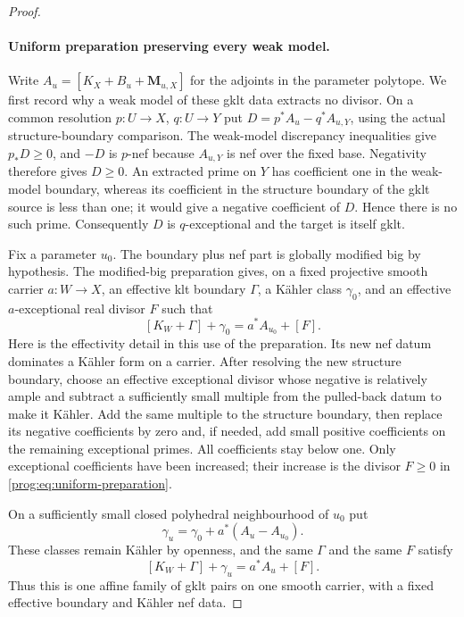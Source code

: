 \begin{proof}
\paragraph{Uniform preparation preserving every weak model.}
\label{prog:uniform-preparation}
Write $A_u=[K_X+B_u+\mathbf M_{u,X}]$ for the adjoints in the
parameter polytope. We first record why a weak model of these gklt data
extracts no divisor. On a common resolution $p:U\to X$, $q:U\to Y$
put $D=p^*A_u-q^*A_{u,Y}$, using the actual structure-boundary
comparison. The weak-model discrepancy inequalities give $p_*D\geq0$,
and $-D$ is $p$-nef because $A_{u,Y}$ is nef over the fixed base.
Negativity therefore gives $D\geq0$. An extracted prime on $Y$ has
coefficient one in the weak-model boundary, whereas its coefficient in
the structure boundary of the gklt source is less than one; it would
give a negative coefficient of $D$. Hence there is no such prime.
Consequently $D$ is $q$-exceptional and the target is itself gklt.

Fix a parameter $u_0$. The boundary plus nef part is globally
modified big by hypothesis. The modified-big preparation
\cite[Lemma~2.23]{HX} gives, on a fixed projective smooth carrier
$a:W\to X$, an effective klt boundary $\Gamma$, a K\"ahler class
$\gamma_0$, and an effective $a$-exceptional real divisor $F$ such that
\begin{equation}\label{prog:eq:uniform-preparation}
             [K_W+\Gamma]+\gamma_0=a^*A_{u_0}+[F].
\end{equation}
Here is the effectivity detail in this use of the preparation. Its new
nef datum dominates a K\"ahler form on a carrier. After resolving the
new structure boundary, choose an effective exceptional divisor whose
negative is relatively ample and subtract a sufficiently small multiple
from the pulled-back datum to make it K\"ahler. Add the same multiple
to the structure boundary,
then replace its negative coefficients by zero and, if needed, add
small positive coefficients on the remaining exceptional primes.
All coefficients stay below one. Only exceptional coefficients have
been increased; their increase is the divisor $F\geq0$ in
\eqref{prog:eq:uniform-preparation}.

On a sufficiently small closed polyhedral neighbourhood of $u_0$ put
\[
                \gamma_u=\gamma_0+a^*(A_u-A_{u_0}).
\]
These classes remain K\"ahler by openness, and the same $\Gamma$ and
the same $F$ satisfy
\[
                  [K_W+\Gamma]+\gamma_u=a^*A_u+[F].
\]
Thus this is one affine family of gklt pairs on one smooth carrier,
with a fixed effective boundary and K\"ahler nef data.


\end{proof}
